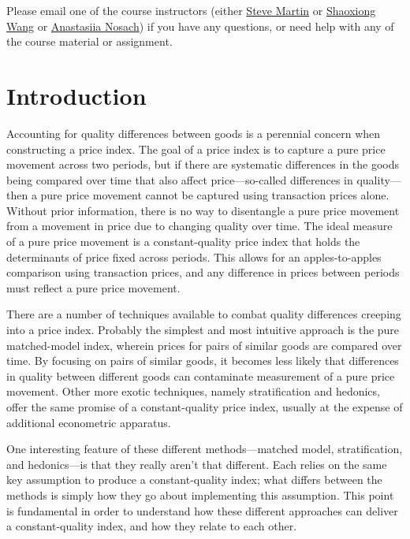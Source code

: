 \documentclass[
]{article}
\begin{document}
Please email one of the course instructors (either \href{mailto:steve.martin5@canada.ca}{Steve Martin} or \href{mailto:shaoxiong.wang@canada.ca}{Shaoxiong Wang} or \href{mailto:anastasiia.nosach@canada.ca}{Anastasiia Nosach}) if you have any questions, or need help with any of the course material or assignment.

\hypertarget{introduction}{%
\section{Introduction}\label{introduction}}

Accounting for quality differences between goods is a perennial concern when constructing a price index. The goal of a price index is to capture a pure price movement across two periods, but if there are systematic differences in the goods being compared over time that also affect price---so-called differences in quality---then a pure price movement cannot be captured using transaction prices alone. Without prior information, there is no way to disentangle a pure price movement from a movement in price due to changing quality over time. The ideal measure of a pure price movement is a constant-quality price index that holds the determinants of price fixed across periods. This allows for an apples-to-apples comparison using transaction prices, and any difference in prices between periods must reflect a pure price movement.

There are a number of techniques available to combat quality differences creeping into a price index. Probably the simplest and most intuitive approach is the pure matched-model index, wherein prices for pairs of similar goods are compared over time. By focusing on pairs of similar goods, it becomes less likely that differences in quality between different goods can contaminate measurement of a pure price movement. Other more exotic techniques, namely stratification and hedonics, offer the same promise of a constant-quality price index, usually at the expense of additional econometric apparatus.

One interesting feature of these different methods---matched model, stratification, and hedonics---is that they really aren't that different. Each relies on the same key assumption to produce a constant-quality index; what differs between the methods is simply how they go about implementing this assumption. This point is fundamental in order to understand how these different approaches can deliver a constant-quality index, and how they relate to each other.
\end{document}
